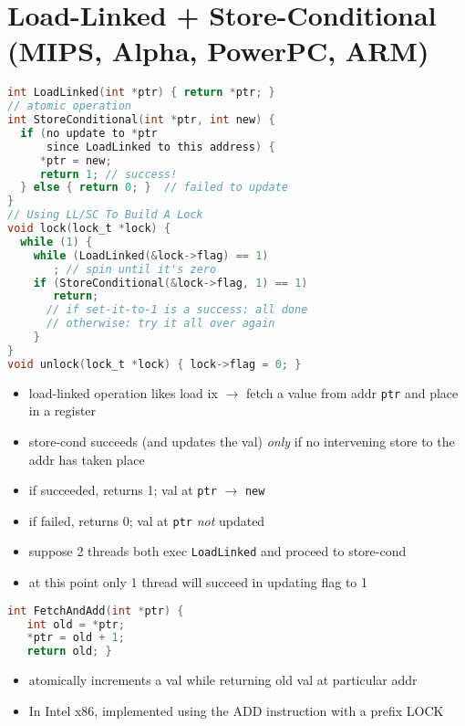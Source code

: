 \section*{Load-Linked + Store-Conditional (MIPS, Alpha, PowerPC, ARM)}
\begin{minipage}{.65\linewidth}
\begin{lstlisting}[language=c]
int LoadLinked(int *ptr) { return *ptr; }
// atomic operation
int StoreConditional(int *ptr, int new) {
  if (no update to *ptr
      since LoadLinked to this address) {
     *ptr = new;
     return 1; // success!
  } else { return 0; }  // failed to update
}
// Using LL/SC To Build A Lock
void lock(lock_t *lock) {
  while (1) {
    while (LoadLinked(&lock->flag) == 1)
       ; // spin until it's zero
    if (StoreConditional(&lock->flag, 1) == 1)
       return;
      // if set-it-to-1 is a success: all done
      // otherwise: try it all over again
    }
}
void unlock(lock_t *lock) { lock->flag = 0; }
\end{lstlisting}
\end{minipage}
\begin{minipage}{.35\linewidth}
  \flushleft
  \begin{itemize}
  \item load-linked operation likes load ix $\to$ fetch a value from addr \texttt{ptr} and place in a register
  \item store-cond succeeds (and updates the val) \emph{only} if no intervening store to the addr has taken place
  \item if succeeded, returns 1; val at \texttt{ptr} $\to$ \texttt{new}
  \item if failed, returns 0; val at \texttt{ptr} \emph{not} updated
  \item suppose 2 threads both exec \texttt{LoadLinked} and proceed to store-cond
  \item at this point only 1 thread will succeed in updating flag to 1
  \end{itemize}
\end{minipage}
\begin{minipage}{.45\linewidth}
\begin{lstlisting}[language=c]
int FetchAndAdd(int *ptr) {
   int old = *ptr;
   *ptr = old + 1;
   return old; }
\end{lstlisting}
\end{minipage}
\begin{minipage}{.55\linewidth}
  \begin{itemize}
  \item atomically increments a val while returning old val at particular addr
  \item In Intel x86, implemented using the ADD instruction with a prefix LOCK
  \end{itemize}
\end{minipage}
